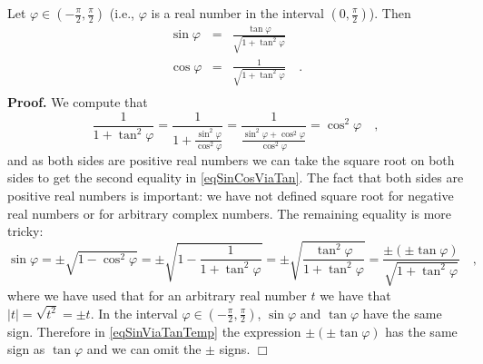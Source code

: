\documentclass[12pt]{book}
\newenvironment{proof}[1][]{ \textbf{Proof#1.} }{$\Box$\medskip}
\begin{document}
Let $\varphi\in (-\frac{\pi}{2} ,\frac{\pi}{2})$ (i.e., $\varphi$ is a real number in the interval $(0,\frac{\pi}{2})$). Then 
\begin{equation}\label{eqSinCosViaTan}
\begin{array}{rcl}
\sin \varphi &=& \frac{ \tan \varphi}{\sqrt  {1+\tan^2 \varphi  }}\\
\cos \varphi &=& \frac{1}{\sqrt  {1+\tan^2 \varphi  }}\quad .\\
\end{array}
\end{equation}
\begin{proof}
We compute that
\[\frac{1}{1+\tan^2 \varphi} = \frac{1}{1+\frac{\sin^2 \varphi}{\cos^2\varphi}}= \frac{1}{\frac{\sin^2\varphi+\cos^2\varphi}{\cos^2\varphi}}= \cos^2{\varphi}\quad , 
\]
and as both sides are positive real numbers we can take the square root on both sides to get the second equality in \eqref{eqSinCosViaTan}. The fact that both sides are positive real numbers is important: we have not defined square root for negative real numbers or for arbitrary complex numbers. The remaining equality is more tricky:
\begin{equation}\label{eqSinViaTanTemp}
\sin \varphi = \pm \sqrt{1-\cos^2\varphi}= \pm \sqrt{1-\frac{1}{1+\tan^2\varphi}}= \pm \sqrt{\frac{\tan^2\varphi}{1+\tan^2\varphi}}=
\frac{\pm (\pm \tan\varphi)}{\sqrt{1+\tan^2\varphi}}\quad ,
\end{equation}
where we have used that for an arbitrary real number $t$ we have that $|t|=\sqrt{t^2}=\pm t$. In the interval $\varphi\in (-\frac{\pi}{2} ,\frac{\pi}{2})$, $\sin \varphi$ and $\tan \varphi$ have the same sign. Therefore in \eqref{eqSinViaTanTemp} the expression $\pm(\pm \tan\varphi)$ has the same sign as $\tan \varphi$ and we can omit the $\pm$ signs.
\end{proof}
\end{document}
